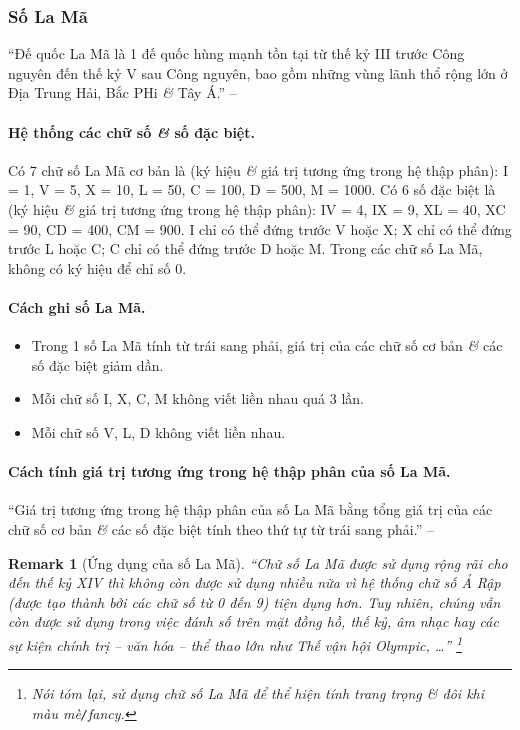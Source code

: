 \documentclass{article}
\numberwithin{equation}{section}
\newtheorem{remark}{Remark}[section]
\begin{document}
\subsubsection{Số La Mã}
``Đế quốc La Mã là 1 đế quốc hùng mạnh tồn tại từ thế kỷ III trước Công nguyên đến thế kỷ V sau Công nguyên, bao gồm những vùng lãnh thổ rộng lớn ở Địa Trung Hải, Bắc PHi \textit{\&} Tây Á.'' -- \cite[p. 14]{Thai_Anh_Dat_Ha_Loan_Nam_Quang_Toan_6_tap_1}

\paragraph{Hệ thống các chữ số \textit{\&} số đặc biệt.} Có 7 chữ số La Mã cơ bản là (ký hiệu \textit{\&} giá trị tương ứng trong hệ thập phân): I = 1, V = 5, X = 10, L = 50, C = 100, D = 500, M = 1000. Có 6 số đặc biệt là (ký hiệu \textit{\&} giá trị tương ứng trong hệ thập phân): IV = 4, IX = 9, XL = 40, XC = 90, CD = 400, CM = 900. I chỉ có thể đứng trước V hoặc X; X chỉ có thể đứng trước L hoặc C; C chỉ có thể đứng trước D hoặc M. Trong các chữ số La Mã, không có ký hiệu để chỉ số 0.

\paragraph{Cách ghi số La Mã.}
\begin{itemize}
	\item Trong 1 số La Mã tính từ trái sang phải, giá trị của các chữ số cơ bản \textit{\&} các số đặc biệt giảm dần.
	\item Mỗi chữ số I, X, C, M không viết liền nhau quá 3 lần.
	\item Mỗi chữ số V, L, D không viết liền nhau.
\end{itemize}

\paragraph{Cách tính giá trị tương ứng trong hệ thập phân của số La Mã.} ``Giá trị tương ứng trong hệ thập phân của số La Mã bằng tổng giá trị của các chữ số cơ bản \textit{\&} các số đặc biệt tính theo thứ tự từ trái sang phải.'' -- \cite[p. 14]{Thai_Anh_Dat_Ha_Loan_Nam_Quang_Toan_6_tap_1}

\begin{remark}[Ứng dụng của số La Mã]
	``Chữ số La Mã được sử dụng rộng rãi cho đến thế kỷ XIV thì không còn được sử dụng nhiều nữa vì hệ thống chữ số Ả Rập (được tạo thành bởi các chữ số từ 0 đến 9) tiện dụng hơn. Tuy nhiên, chúng vẫn còn được sử dụng trong việc đánh số trên mặt đồng hồ, thế kỷ, âm nhạc hay các sự kiện chính trị -- văn hóa -- thể thao lớn như Thế vận hội Olympic, \ldots'' \footnote{Nói tóm lại, sử dụng chữ số La Mã để thể hiện tính trang trọng \textit{\&} đôi khi màu mè\texttt{/}fancy.}
\end{remark}
\end{document}
